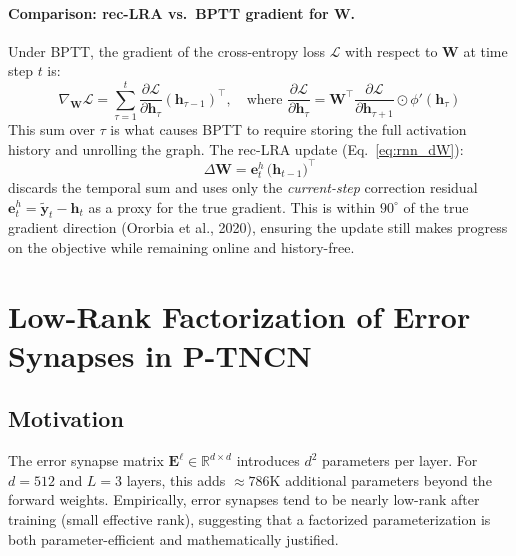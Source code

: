 \documentclass[11pt]{article}
\theoremstyle{definition}
\newcommand{\E}{\mathbf{E}}
\newcommand{\Rbb}{\mathbb{R}}
\begin{document}
\paragraph{Comparison: rec-LRA vs.\ BPTT gradient for $\mathbf{W}$.}
Under BPTT, the gradient of the cross-entropy loss $\mathcal{L}$ with respect to
$\mathbf{W}$ at time step $t$ is:
\begin{equation}
  \nabla_{\mathbf{W}} \mathcal{L}
    = \sum_{\tau=1}^{t} \frac{\partial \mathcal{L}}{\partial \mathbf{h}_\tau}
      \left(\mathbf{h}_{\tau-1}\right)^\top,
  \quad \text{where }
  \frac{\partial \mathcal{L}}{\partial \mathbf{h}_\tau}
    = \mathbf{W}^\top \frac{\partial \mathcal{L}}{\partial \mathbf{h}_{\tau+1}}
      \odot \phi'(\mathbf{h}_\tau)
\end{equation}
This sum over $\tau$ is what causes BPTT to require storing the full activation
history and unrolling the graph. The rec-LRA update (Eq.~\eqref{eq:rnn_dW}):
\begin{equation}
  \Delta\mathbf{W} = \mathbf{e}^h_t\,\bigl(\mathbf{h}_{t-1}\bigr)^\top
\end{equation}
discards the temporal sum and uses only the \emph{current-step} correction
residual $\mathbf{e}^h_t = \tilde{\mathbf{y}}_t - \mathbf{h}_t$ as a proxy
for the true gradient. This is within $90^\circ$ of the true gradient direction
(Ororbia et al., 2020), ensuring the update still makes progress on the objective
while remaining online and history-free.

\section{Low-Rank Factorization of Error Synapses in P-TNCN}

\subsection{Motivation}

The error synapse matrix $\E^\ell \in \Rbb^{d \times d}$ introduces $d^2$
parameters per layer. For $d = 512$ and $L = 3$ layers, this adds $\approx 786$K
additional parameters beyond the forward weights. Empirically, error synapses
tend to be nearly low-rank after training (small effective rank), suggesting
that a factorized parameterization is both parameter-efficient and
mathematically justified.
\end{document}
